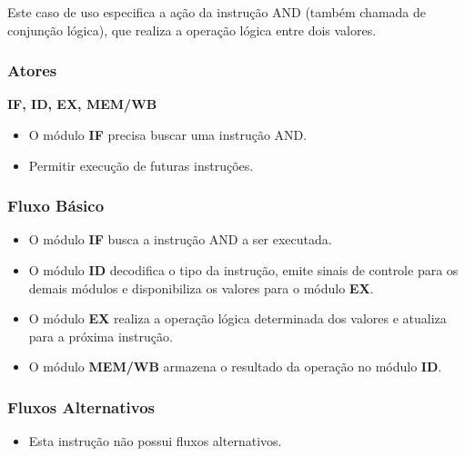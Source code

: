 
Este caso de uso especifica a ação da instrução AND (também chamada de conjunção lógica), que realiza a operação lógica entre dois valores.
 
\subsubsection*{Atores}
\textbf{IF, ID, EX, MEM/WB}

\preconditions 
\begin{itemize}
 \item O módulo \textbf{IF} precisa buscar uma instrução AND.
\end{itemize}

\postconditions
\begin{itemize}	
  \item Permitir execução de futuras instruções.
\end{itemize}

\subsubsection*{Fluxo Básico}
\begin{itemize}
\item O módulo \textbf{IF} busca a instrução AND a ser executada.
\item O módulo \textbf{ID} decodifica o tipo da instrução, emite sinais de controle para os demais módulos e disponibiliza os valores para o módulo \textbf{EX}.
\item O módulo \textbf{EX} realiza a operação lógica determinada dos valores e atualiza para a próxima instrução.
\item O módulo \textbf{MEM/WB} armazena o resultado da operação no módulo \textbf{ID}.
\end{itemize}

\subsubsection*{Fluxos Alternativos}
\begin{itemize}
\item Esta instrução não possui fluxos alternativos.
\end{itemize}

%		

